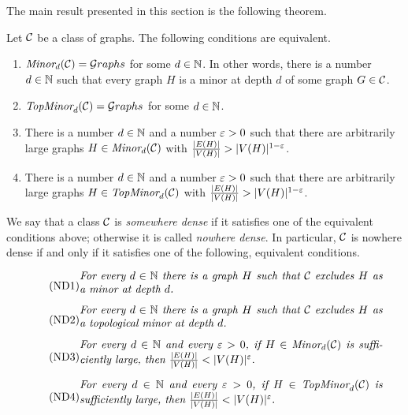 The main result presented in this section is the following theorem.
\begin{theorem}\label{thm:nowhere-dense}
	Let ${\cal C}$ be a class of graphs. 
	The following conditions are equivalent.
	\begin{enumerate}
		\item\label{it:clique-minor}  $\textit{Minor}_{d}({\cal C})={\mathcal G}\!\,raphs$ for some $d\in\mathbb{N}$.
		In other words, 
		there is a number $d\in\mathbb{N}$ such that 
		every graph $H$ is a minor at depth $d$ 
		of some graph $G\in{\cal C}$.
		
		\item\label{it:clique-topminor}  $\textit{TopMinor}_{d}({\cal C})={\mathcal G}\!\,raphs$ for some $d\in\mathbb{N}$. %
		
		\item\label{it:dense-minor} There is a number $d\in \mathbb{N}$ and a number 
		   $\varepsilon>0$ such that 
		there are arbitrarily large graphs $H\in\textit{Minor}_{d}({\cal C})$ with $\frac{|E(H)|}{|V(H)|}> |V(H)|^{1-\varepsilon}$.
		
		\item\label{it:dense-topminor} There is a number $d\in \mathbb{N}$ and a number 
		   $\varepsilon>0$ such that 
		there are arbitrarily large graphs $H\in\textit{TopMinor}_{d}({\cal C})$ with $\frac{|E(H)|}{|V(H)|}> |V(H)|^{1-\varepsilon}$.
	\end{enumerate}
\end{theorem}


We say that a class ${\cal C}$ is \emph{somewhere dense}
if it satisfies one of the equivalent conditions above;
otherwise it is called \emph{nowhere dense}.
In particular, ${\cal C}$ is nowhere dense if and only if it satisfies one of the following, equivalent conditions.

\begin{align}
  \label{char:nd}\tag{ND1}
\begin{minipage}[c]{0.8\textwidth}\it\noindent For every $d\in \N$ there is a graph $H$ 
	such that $\Cc$ excludes $H$ as a minor at depth $d$.\medskip\end{minipage}
  \\
  \label{char:nd-top}\tag{ND2}
  \begin{minipage}[c]{0.8\textwidth}\it\noindent For every $d\in \N$ there is a graph $H$
  	such that $\Cc$ excludes $H$ as a topological minor at depth~$d$.\medskip\end{minipage}
    \\        
  \label{char:nd-dens}\tag{ND3}
  \begin{minipage}[c]{0.8\textwidth}\it\noindent For every $d\in\N$ and every $\eps>0$, if $H\in\minors d\Cc$ is sufficiently large, then $\frac{|E(H)|}{|V(H)|}<|V(H)|^\eps$.\medskip\end{minipage}
  \\
  \label{char:nd-dens-top}\tag{ND4}
  \begin{minipage}[c]{0.8\textwidth}\it\noindent For every $d\in\N$ and every $\eps>0$, if $H\in\tminors d\Cc$ is sufficiently large, then $\frac{|E(H)|}{|V(H)|}<|V(H)|^\eps$.\medskip\end{minipage}
\end{align}


